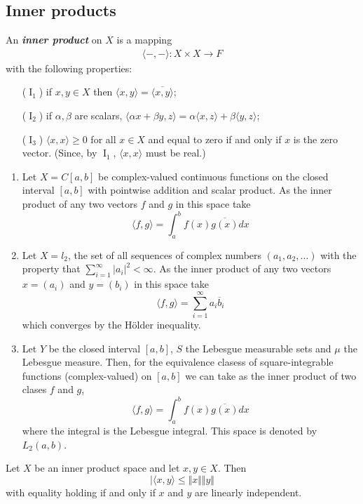 \documentclass{article}
\theoremstyle{definition}
\numberwithin{equation}{section}
\begin{document}
	\subsection{Inner products} An \textbf{\textit{inner product}} on $X$ is a mapping
	\begin{align*}
		\langle-,-\rangle:X\times X\to F
	\end{align*}
	with the following properties:
	\begin{enumerate}
		\item[($\operatorname{I}_1$)] if $x,y\in X$ then $\langle x,y\rangle=\overline{\langle x,y\rangle}$;
		\item[($\operatorname{I}_2$)] if $\alpha,\beta$ are scalars, $\langle\alpha x+\beta y,z\rangle =\alpha\langle x,z\rangle+\beta\langle y,z\rangle$;
		\item[($\operatorname{I}_3$)] $\langle x,x\rangle\geq0$ for all $x\in X$ and equal to zero if and only if $x$ is the zero vector. (Since, by $\operatorname{I}_1$, $\langle x,x\rangle$ must be real.)
	\end{enumerate}
	\begin{examples}\leavevmode
		\begin{enumerate}
			\item Let $X=C[a,b]$ be complex-valued continuous functions on the closed interval $[a,b]$ with pointwise addition and scalar product. As the inner product of any two vectors $f$ and $g$ in this space take
		\[\langle f,g\rangle=\int_a^bf(x)\overline{g(x)}dx\]
		\item Let $X=l_2$, the set of all sequences of complex numbers $(a_1,a_2,\ldots)$ with the property that $\sum_{i=1}^\infty|a_i|^2<\infty$. As the inner product of any two vectors $x=(a_i)$ and $y=(b_i)$ in this space take
		\[\langle f,g\rangle=\sum_{i=1}^\infty a_i\overline{b}_i\]
		which converges by the Hölder inequality.
		
		\item Let $Y$ be the closed interval $[a,b]$, $S$ the Lebesgue measurable sets and $\mu$ the Lebesgue measure. Then, for the equivalence clasess of square-integrable functions (complex-valued) on $[a,b]$ we can take as the inner product of two clases $f$ and $g$,
				\[\langle f,g\rangle=\int_a^bf(x)\overline{g(x)}dx\]
		where the integral is the Lebesgue integral. This space is denoted by $L_2(a,b)$.
		\end{enumerate}
		\end{examples}
		\begin{thm}
			Let $X$ be an inner product space and let $x,y\in X$. Then
			\[|\langle x,y\rangle\leq\Vert x\Vert\Vert y\Vert\]
			with equality holding if and only if $x$ and $y$ are linearly independent.
		\end{thm}
\end{document}
